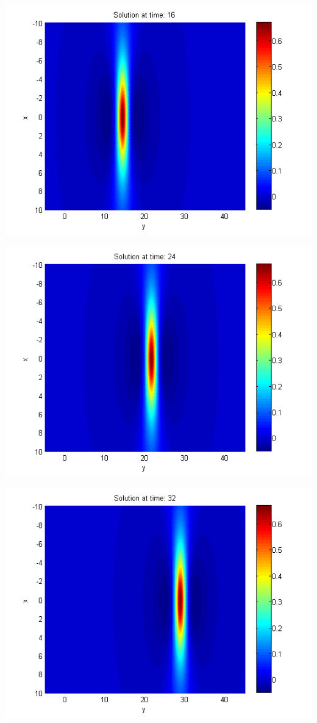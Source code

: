 \documentclass{beamer}
\begin{document}
\begin{frame}
\begin{center}
\begin{minipage}[b]{0.30\linewidth}
		 \includegraphics[width=\linewidth]{figures/Solution1_t=16.png}
	\end{minipage}
	\begin{minipage}[b]{0.30\linewidth}
		\includegraphics[width=\linewidth]{figures/Solution1_t=24.png}
	\end{minipage}	
	\begin{minipage}[b]{0.30\linewidth}
		 \includegraphics[width=\linewidth]{figures/Solution1_t=32.png}

\end{minipage}
\end{center}
\end{frame}
\end{document}
